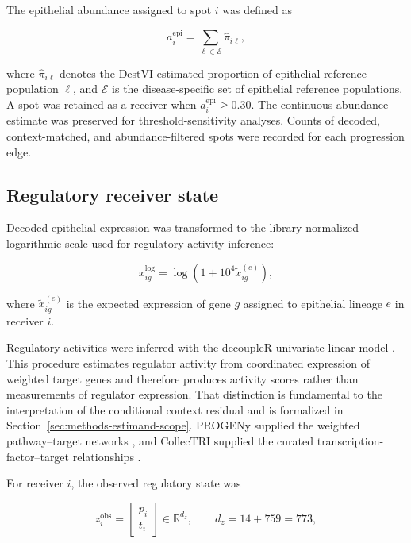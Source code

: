 The epithelial abundance assigned to spot \(i\) was defined as

\begin{equation}
a_i^{\mathrm{epi}}
=
\sum_{\ell\in\mathcal{E}}
\widehat{\pi}_{i\ell},
\label{eq:methods-epi-abundance}
\end{equation}

where \(\widehat{\pi}_{i\ell}\) denotes the DestVI-estimated proportion of epithelial reference population \(\ell\), and \(\mathcal{E}\) is the disease-specific set of epithelial reference populations. A spot was retained as a receiver when \(a_i^{\mathrm{epi}} \geq 0.30\). The continuous abundance
estimate was preserved for threshold-sensitivity analyses. Counts of decoded, context-matched, and abundance-filtered spots were recorded for each progression edge.

\subsection{Regulatory receiver state}
\label{sec:methods-receiver-state}

Decoded epithelial expression was transformed to the library-normalized logarithmic scale used for regulatory activity inference:

\begin{equation}
x_{ig}^{\mathrm{log}}
=
\log\!\left(
1+10^{4}\widetilde{x}_{ig}^{(e)}
\right),
\label{eq:methods-decoded-log}
\end{equation}

where \(\widetilde{x}_{ig}^{(e)}\) is the expected expression of gene \(g\) assigned to epithelial lineage \(e\) in receiver \(i\).

Regulatory activities were inferred with the decoupleR univariate linear model
\autocite{Badia-I-Mompel2022-te}. This procedure estimates regulator activity from coordinated expression of weighted target genes and therefore produces activity scores rather than measurements of regulator expression. That
distinction is fundamental to the interpretation of the conditional context residual and is formalized in Section~\ref{sec:methods-estimand-scope}. PROGENy supplied the weighted pathway--target networks \autocite{Schubert2018-ph}, and CollecTRI supplied the
curated transcription-factor--target relationships
\autocite{Muller-Dott2023-mu}.

For receiver \(i\), the observed regulatory state was

\begin{equation}
z_i^{\mathrm{obs}}
=
\begin{bmatrix}
p_i \\
t_i
\end{bmatrix}
\in
\mathbb{R}^{d_z},
\qquad
d_z = 14 + 759 = 773,
\label{eq:methods-receiver-state}
\end{equation}

